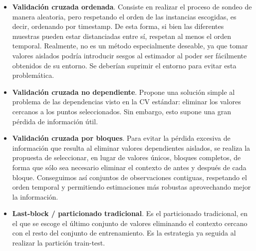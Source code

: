 \begin{itemize}
	\item \textbf{Validación cruzada ordenada}. Consiste en realizar el proceso de sondeo de manera aleatoria, pero respetando el orden de las instancias escogidas, es decir, ordenando por timestamp. De esta forma, si bien las diferentes muestras pueden estar distanciadas entre sí, respetan al menos el orden temporal. Realmente, no es un método especialmente deseable, ya que tomar valores aislados podría introducir sesgos al estimador al poder ser fácilmente obtenidos de su entorno. Se deberían suprimir el entorno para evitar esta problemática.
	\item \textbf{Validación cruzada no dependiente}. Propone una solución simple al problema de las dependencias visto en la CV estándar: eliminar los valores cercanos a los puntos seleccionados. Sin embargo, esto supone una gran pérdida de información útil.
	\item \textbf{Validación cruzada por bloques}. Para evitar la pérdida excesiva de información que resulta al eliminar valores dependientes aislados, se realiza la propuesta de seleccionar, en lugar de valores únicos, bloques completos, de forma que sólo sea necesario eliminar el contexto de antes y después de cada bloque. Conseguimos así conjuntos de observaciones contiguas, respetando el orden temporal y permitiendo estimaciones más robustas aprovechando mejor la información.
	\item \textbf{Last-block / particionado tradicional}. Es el particionado tradicional, en el que se escoge el último conjunto de valores eliminando el contexto cercano con el resto del conjunto de entrenamiento. Es la estrategia ya seguida al realizar la partición train-test.
\end{itemize}

